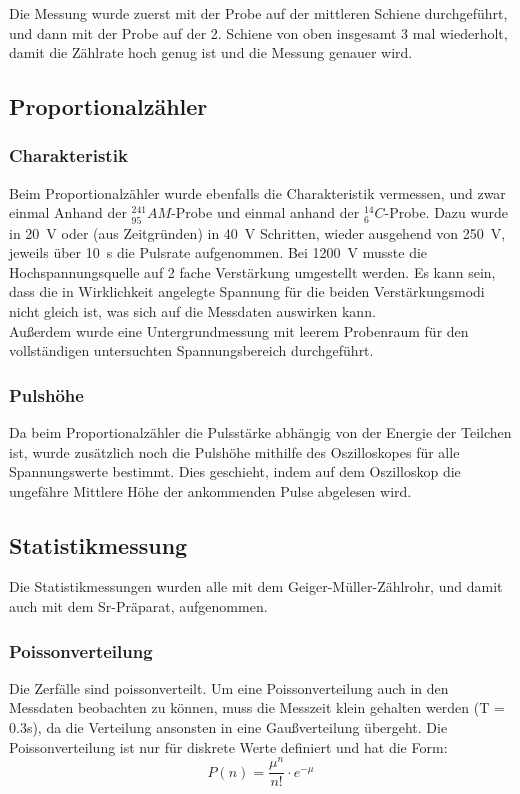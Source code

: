 \documentclass[12pt,a4paper]{article}
\begin{document}
Die Messung wurde zuerst mit der Probe auf der mittleren Schiene durchgeführt, und dann mit der Probe auf der 2. Schiene von oben insgesamt 3 mal wiederholt, damit die Zählrate hoch genug ist und die Messung genauer wird.
\subsection{Proportionalzähler}

\subsubsection{Charakteristik}
Beim Proportionalzähler wurde ebenfalls die Charakteristik vermessen, und zwar einmal Anhand der $_{95}^{241}AM$-Probe und einmal anhand der $_6^{14}C$-Probe. Dazu wurde in \SI{20}{V} oder (aus Zeitgründen) in \SI{40}{V} Schritten, wieder ausgehend von \SI{250}{V}, jeweils über \SI{10}{s} die Pulsrate aufgenommen. Bei \SI{1200}{V} musste die Hochspannungsquelle auf 2 fache Verstärkung umgestellt werden. Es kann sein, dass die in Wirklichkeit angelegte Spannung für die beiden Verstärkungsmodi nicht gleich ist, was sich auf die Messdaten auswirken kann.\\
Außerdem wurde eine Untergrundmessung mit leerem Probenraum für den vollständigen untersuchten Spannungsbereich durchgeführt.

\subsubsection{Pulshöhe}
Da beim Proportionalzähler die Pulsstärke abhängig von der Energie der Teilchen ist, wurde zusätzlich noch die Pulshöhe mithilfe des Oszilloskopes für alle Spannungswerte bestimmt.  Dies geschieht, indem auf dem Oszilloskop die ungefähre Mittlere Höhe der ankommenden Pulse abgelesen wird.

\subsection{Statistikmessung}
Die Statistikmessungen wurden alle mit dem Geiger-Müller-Zählrohr, und damit auch mit dem Sr-Präparat, aufgenommen.
\subsubsection{Poissonverteilung}
Die Zerfälle sind poissonverteilt. Um eine Poissonverteilung auch in den Messdaten beobachten zu können, muss die Messzeit klein gehalten werden (T = 0.3s), da die Verteilung ansonsten in eine Gaußverteilung übergeht. Die Poissonverteilung ist nur für diskrete Werte definiert und hat die Form:
\begin{equation}
P(n) = \dfrac{\mu ^n}{n!} \cdot e^{-\mu}
\end{equation}
\end{document}
